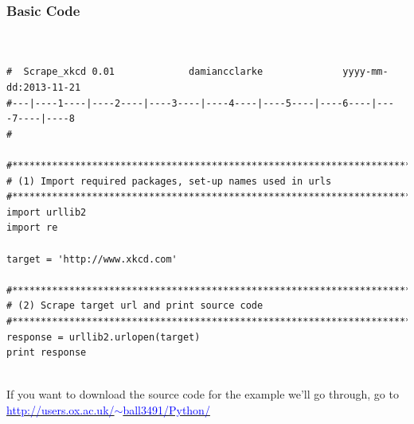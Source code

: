 \documentclass[10pt,letterpaper,subeqn]{beamer}
\begin{document}

\begin{frame}[fragile]
 \frametitle{Basic Code}
 \begin{verbatim}


#  Scrape_xkcd 0.01             damiancclarke              yyyy-mm-dd:2013-11-21
#---|----1----|----2----|----3----|----4----|----5----|----6----|----7----|----8
#

#*******************************************************************************
# (1) Import required packages, set-up names used in urls
#*******************************************************************************
import urllib2
import re

target = 'http://www.xkcd.com'

#*******************************************************************************
# (2) Scrape target url and print source code
#*******************************************************************************
response = urllib2.urlopen(target)
print response


\end{verbatim}
\vspace{6mm}
\begin{scriptsize}
If you want to download the source code for the example we'll go through, go to
\href{http://users.ox.ac.uk/~ball3491/Python/}{\textcolor{blue}{http://users.ox.ac.uk/$\sim$ball3491/Python/}}
\end{scriptsize}

\end{frame}
\end{document}

